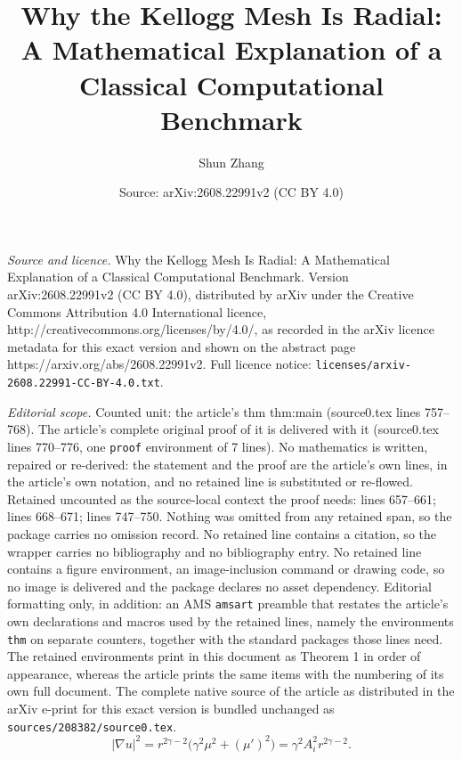 \documentclass[10pt,a4paper]{amsart}
\title{Why the Kellogg Mesh Is Radial: A Mathematical Explanation of a Classical Computational Benchmark}
\author{Shun Zhang}
\date{Source: arXiv:2608.22991v2 (CC BY 4.0)}
\begin{document}
\maketitle

\noindent\emph{Source and licence.} Why the Kellogg Mesh Is Radial: A Mathematical Explanation of a Classical Computational Benchmark. Version arXiv:2608.22991v2 (CC BY 4.0), distributed by arXiv under the Creative Commons Attribution 4.0 International licence, http://creativecommons.org/licenses/by/4.0/, as recorded in the arXiv licence metadata for this exact version and shown on the abstract page https://arxiv.org/abs/2608.22991v2. Full licence notice: \texttt{licenses/arxiv-2608.22991-CC-BY-4.0.txt}.\par\smallskip

\noindent\textit{Editorial scope.} Counted unit: the article's thm thm:main (source0.tex lines 757--768). The article's complete original proof of it is delivered with it (source0.tex lines 770--776, one \texttt{proof} environment of 7 lines). No mathematics is written, repaired or re-derived: the statement and the proof are the article's own lines, in the article's own notation, and no retained line is substituted or re-flowed.  Retained uncounted as the source-local context the proof needs: lines 657--661; lines 668--671; lines 747--750.  Nothing was omitted from any retained span, so the package carries no omission record.  No retained line contains a citation, so the wrapper carries no bibliography and no bibliography entry.  No retained line contains a figure environment, an image-inclusion command or drawing code, so no image is delivered and the package declares no asset dependency.  Editorial formatting only, in addition: an AMS \texttt{amsart} preamble that restates the article's own declarations and macros used by the retained lines, namely the environments \texttt{thm} on separate counters, together with the standard packages those lines need.  The retained environments print in this document as Theorem 1 in order of appearance, whereas the article prints the same items with the numbering of its own full document.  The complete native source of the article as distributed in the arXiv e-print for this exact version is bundled unchanged as \texttt{sources/208382/source0.tex}.
\begin{equation}\label{eq:sector-gradient}
 |\nabla u|^2
 =r^{2\gamma-2}\bigl(\gamma^2\mu^2+(\mu')^2\bigr)
 =\gamma^2A_i^2r^{2\gamma-2}.
\end{equation}
\end{document}
